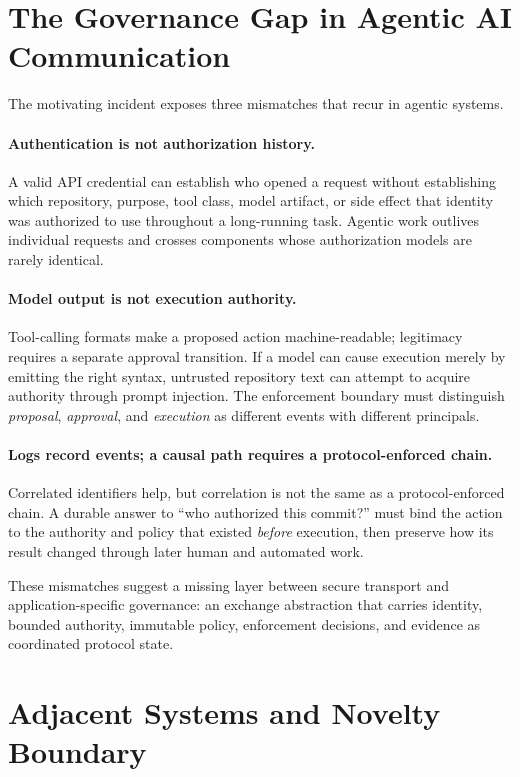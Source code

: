 \documentclass[10pt]{article}
\begin{document}
\section{The Governance Gap in Agentic AI Communication}

The motivating incident exposes three mismatches that recur in agentic systems.

\paragraph{Authentication is not authorization history.}
A valid API credential can establish who opened a request without establishing which repository, purpose, tool class, model artifact, or side effect that identity was authorized to use throughout a long-running task. Agentic work outlives individual requests and crosses components whose authorization models are rarely identical.

\paragraph{Model output is not execution authority.}
Tool-calling formats make a proposed action machine-readable; legitimacy requires a separate approval transition. If a model can cause execution merely by emitting the right syntax, untrusted repository text can attempt to acquire authority through prompt injection. The enforcement boundary must distinguish \emph{proposal}, \emph{approval}, and \emph{execution} as different events with different principals.

\paragraph{Logs record events; a causal path requires a protocol-enforced chain.}
Correlated identifiers help, but correlation is not the same as a protocol-enforced chain. A durable answer to ``who authorized this commit?'' must bind the action to the authority and policy that existed \emph{before} execution, then preserve how its result changed through later human and automated work.

These mismatches suggest a missing layer between secure transport and application-specific governance: an exchange abstraction that carries identity, bounded authority, immutable policy, enforcement decisions, and evidence as coordinated protocol state.

\section{Adjacent Systems and Novelty Boundary}
\end{document}
